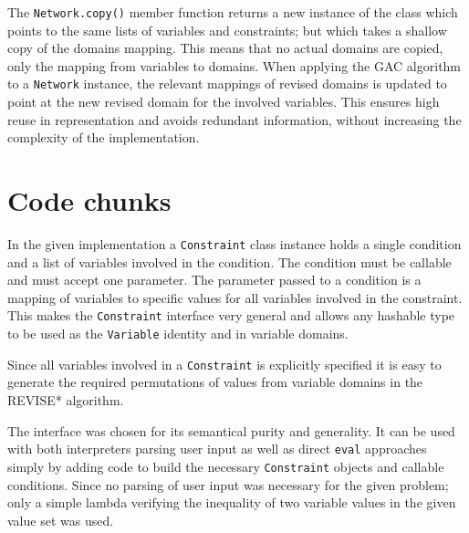 The \texttt{Network.copy()} member function returns a new instance of the class which points to the same lists of variables and constraints; but which takes a shallow copy of the domains mapping. This means that no actual domains are copied, only the mapping from variables to domains. When applying the GAC algorithm to a \texttt{Network} instance, the relevant mappings of revised domains is updated to point at the new revised domain for the involved variables. This ensures high reuse in representation and avoids redundant information, without increasing the complexity of the implementation.

\section*{Code chunks}

In the given implementation a \texttt{Constraint} class instance holds a single condition and a list of variables involved in the condition. The condition must be callable and must accept one parameter. The parameter passed to a condition is a mapping of variables to specific values for all variables involved in the constraint. This makes the \texttt{Constraint} interface very general and allows any hashable type to be used as the \texttt{Variable} identity and in variable domains.

Since all variables involved in a \texttt{Constraint} is explicitly specified it is easy to generate the required permutations of values from variable domains in the \textsc{REVISE*} algorithm.

The interface was chosen for its semantical purity and generality. It can be used with both interpreters parsing user input as well as direct \texttt{eval} approaches simply by adding code to build the necessary \texttt{Constraint} objects and callable conditions. Since no parsing of user input was necessary for the given problem; only a simple lambda verifying the inequality of two variable values in the given value set was used.



